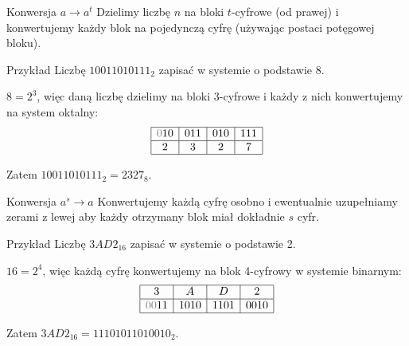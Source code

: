\documentclass[a4paper,10pt]{beamer}
\begin{document}
\begin{frame}
	
	\begin{block}{Konwersja $a \to a^t$}
		Dzielimy liczbę $n$ na bloki $t$-cyfrowe (od prawej) i konwertujemy każdy blok na pojedynczą cyfrę (używając postaci potęgowej bloku).
	\end{block}

	\begin{exampleblock}{Przykład}
		Liczbę $10011010111_2$ zapisać w systemie o podstawie 8.
		
		$8=2^3$, więc daną liczbę dzielimy na bloki 3-cyfrowe i każdy z nich konwertujemy na system oktalny: 
		$$\begin{array}{|c|c|c|c|}\hline
		\textcolor{gray}{0}10&011&010&111\\\hline
		2&3&2&7\\\hline
		\end{array}$$
		
		Zatem $10011010111_2=2327_8$.
	\end{exampleblock}

\end{frame}


\begin{frame}
	
	\begin{block}{Konwersja $a^s \to a$}
		Konwertujemy każdą cyfrę osobno i ewentualnie uzupełniamy zerami z lewej aby każdy otrzymany blok miał dokładnie $s$ cyfr.
	\end{block}

	\begin{exampleblock}{Przykład}
	Liczbę $3AD2_{16}$ zapisać w systemie o podstawie 2.
	
	$16=2^4$, więc każdą cyfrę konwertujemy na blok 4-cyfrowy w systemie binarnym:
	$$\begin{array}{|c|c|c|c|}\hline
	3&A&D&2\\\hline
	\textcolor{gray}{00}11&1010&1101&0010\\\hline
	\end{array}$$
	
	Zatem $3AD2_{16}=11101011010010_2$.
	\end{exampleblock}
	
\end{frame}
\end{document}

